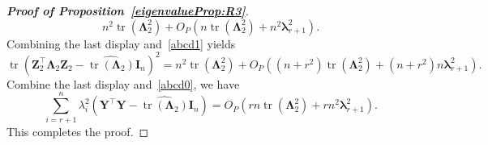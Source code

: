 \documentclass[10pt]{book}
\theoremstyle{definition}
\DeclareMathOperator{\mytr}{tr}
\newcommand{\bZ}{\mathbf{Z}}
\newcommand{\bY}{\mathbf{Y}}
\newcommand{\bI}{\mathbf{I}}
\newcommand{\bfsym}[1]{\ensuremath{\boldsymbol{#1}}}
\def\blambda {\bfsym {\lambda}}
\def\bLambda {\bfsym {\Lambda}}
\begin{document}
\begin{proof}[\textbf{Proof of Proposition~\ref{eigenvalueProp:R3}}]
\begin{equation*}
            n^2 \mytr(\bLambda_2^2)+O_P\left( n \mytr(\bLambda_2^2)+ n^{2}\blambda_{r+1}^2\right).
    \end{equation*}
    Combining the last display and~\eqref{abcd1} yields
    \begin{equation*}
        \mytr(\bZ_2^\top\bLambda_2 \bZ_2-\widehat{\mytr(\bLambda_2)}\bI_n)^2
        =
        n^2 \mytr(\bLambda_2^2)+O_P\left( (n+r^2) \mytr(\bLambda_2^2)+ (n+r^2)n\blambda_{r+1}^2\right)
        .
    \end{equation*}
    Combine the last display and~\eqref{abcd0}, we have
    \begin{equation*}
            \sum_{i=r+1}^n \lambda_i^2\left(\bY^\top \bY-\widehat{\mytr(\bLambda_2)}\bI_n\right)
            =
            O_P\left(rn \mytr(\bLambda_2^2) + r n^2 \blambda_{r+1}^2\right).
    \end{equation*}
    This completes the proof.

\end{proof}
\end{document}
